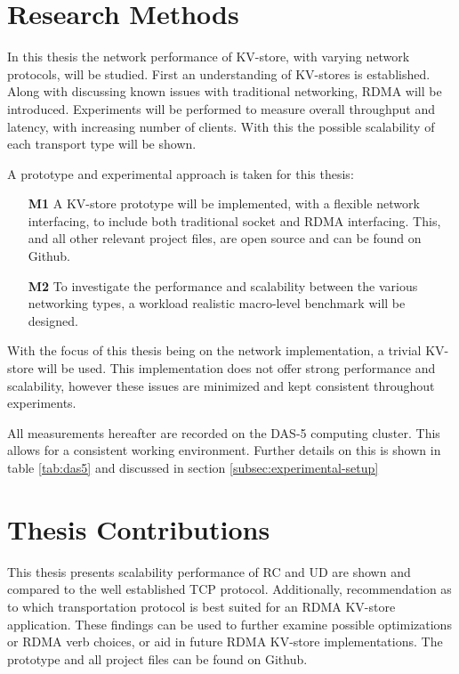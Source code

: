 \section{Research Methods}
In this thesis the network performance of KV-store, with varying network protocols, will be studied.
First an understanding of KV-stores is established.
Along with discussing known issues with traditional networking, RDMA will be introduced.
Experiments will be performed to measure overall throughput and latency, with increasing number of clients.
With this the possible scalability of each transport type will be shown.

A prototype\cite{iosup2019atlarge,hamming1998art,peffers2007design} and experimental\cite{jain1990art,heiser2010,ousterhout2018always} approach is taken for this thesis:
\begin{itemize}
    \item[\textbf{M1}] A KV-store prototype will be implemented, with a flexible network interfacing, to include both traditional socket and RDMA interfacing.
    This, and all other relevant project files, are open source and can be found on Github\cite{github}.
    \item[\textbf{M2}] To investigate the performance and scalability between the various networking types, a workload realistic\cite{atikoglu2012workload} macro-level benchmark will be designed.
\end{itemize}

With the focus of this thesis being on the network implementation, a trivial KV-store will be used.
This implementation does not offer strong performance and scalability, however these issues are minimized and kept consistent throughout experiments.

All measurements hereafter are recorded on the DAS-5 computing cluster.
This allows for a consistent working environment.
Further details on this is shown in table \ref{tab:das5} and discussed in section \ref{subsec:experimental-setup}

\section{Thesis Contributions}
This thesis presents scalability performance of RC and UD are shown and compared to the well established TCP protocol.
Additionally, recommendation as to which transportation protocol is best suited for an RDMA KV-store application.
These findings can be used to further examine possible optimizations or RDMA verb choices, or aid in future RDMA KV-store implementations.
The prototype and all project files can be found on Github\cite{github}.

